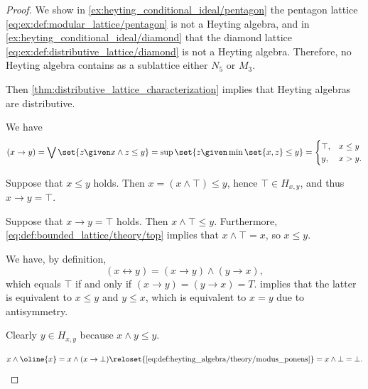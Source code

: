 \begin{proof}
   We show in \cref{ex:heyting_conditional_ideal/pentagon} the pentagon lattice \eqref{eq:ex:def:modular_lattice/pentagon} is not a Heyting algebra, and in \cref{ex:heyting_conditional_ideal/diamond} that the diamond lattice \eqref{eq:ex:def:distributive_lattice/diamond} is not a Heyting algebra. Therefore, no Heyting algebra contains as a sublattice either \( N_5 \) or \( M_3 \).

  Then \cref{thm:distributive_lattice_characterization} implies that Heyting algebras are distributive.

   We have
  \begin{equation*}
    (x \rightarrow y)
    =
    \bigvee\set{ z \given x \wedge z \leq y }
    =
    \sup\set{ z \given \min\set{ x, z } \leq y }
    =
    \begin{cases}
      \top, &x \leq y \\
      y,    &x > y.
    \end{cases}
  \end{equation*}


  \SufficiencySubProof* Suppose that \( x \leq y \) holds. Then \( x = (x \wedge \top) \leq y \), hence \( \top \in H_{x,y} \), and thus \( x \rightarrow y = \top \).

  \NecessitySubProof* Suppose that \( x \rightarrow y = \top \) holds. Then \( x \wedge \top \leq y \). Furthermore, \eqref{eq:def:bounded_lattice/theory/top} implies that \( x \wedge \top = x \), so \( x \leq y \).

   We have, by definition,
  \begin{equation*}
    (x \leftrightarrow y) = (x \rightarrow y) \wedge (y \rightarrow x),
  \end{equation*}
  which equals \( \top \) if and only if \( (x \rightarrow y) = (y \rightarrow x) = T \).  implies that the latter is equivalent to \( x \leq y \) and \( y \leq x \), which is equivalent to \( x = y \) due to antisymmetry.

   Clearly \( y \in H_{x,y} \) because \( x \wedge y \leq y \).

  \begin{equation*}
    x \wedge \oline{x}
    =
    x \wedge (x \rightarrow \bot)
    \reloset {\eqref{eq:def:heyting_algebra/theory/modus_ponens}} =
    x \wedge \bot
    =
    \bot.
  \end{equation*}


\end{proof}
